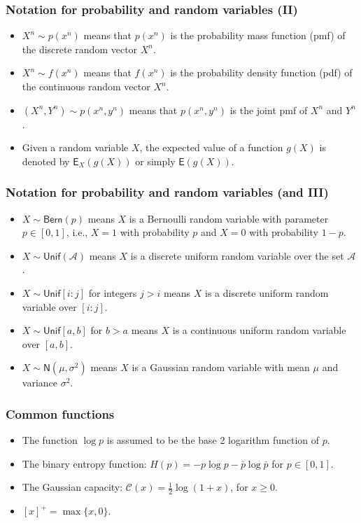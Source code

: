 \documentclass{beamer}
\begin{document}
\begin{frame}
\frametitle{Notation for probability and random variables (II)}
\begin{itemize}
\item $X^n \sim p(x^n)$ means that $p(x^n)$ is the probability mass function (pmf) of the discrete random vector $X^n$.
\item $X^n \sim f(x^n)$ means that $f(x^n)$ is the probability density function (pdf) of the continuous random vector $X^n$.
\item $(X^n, Y^n)\sim p(x^n,y^n)$ means that $p(x^n,y^n)$ is the joint pmf of $X^n$ and $Y^n$.
\item Given a random variable $X$, the expected value of a function $g(X)$ is denoted by $\mathsf E_X(g(X))$ or simply $\mathsf E(g(X))$.

\end{itemize}
\end{frame}

\begin{frame}
\frametitle{Notation for probability and random variables (and III)}
\begin{itemize}
\item $X\sim \mathsf{Bern}(p)$ means $X$ is a Bernoulli random variable with parameter $p\in [0,1]$, i.e., $X=1$ with probability $p$ and $X=0$ with probability $1-p$.
\item $X\sim \mathsf{Unif}(\mathcal A)$ means $X$ is a discrete uniform random variable over the set $\mathcal A$.
\item $X\sim \mathsf{Unif}[i:j]$ for integers $j>i$ means $X$ is a discrete uniform random variable over $[i:j]$.
\item $X\sim \mathsf{Unif}[a,b]$ for $b>a$ means $X$ is a continuous uniform random variable over $[a,b]$.
\item $X\sim \mathsf{N}(\mu, \sigma^2)$ means $X$ is a Gaussian  random variable with mean $\mu$ and variance $\sigma^2$.
\end{itemize}
\end{frame}

\begin{frame}
\frametitle{Common functions}
\begin{itemize}
\item The function $\log p$ is assumed to be the base 2 logarithm function of $p$.
\item The binary entropy function: $H(p)=-p\log p - \bar p \log \bar p$ for $p\in [0,1]$.
\item The Gaussian capacity: $\mathcal C(x)=\frac{1}{2}\log(1+x)$, for $x\geq 0$.
\item $[x]^+=\max\{x,0\}$.
\end{itemize}
\end{frame}
\end{document}
